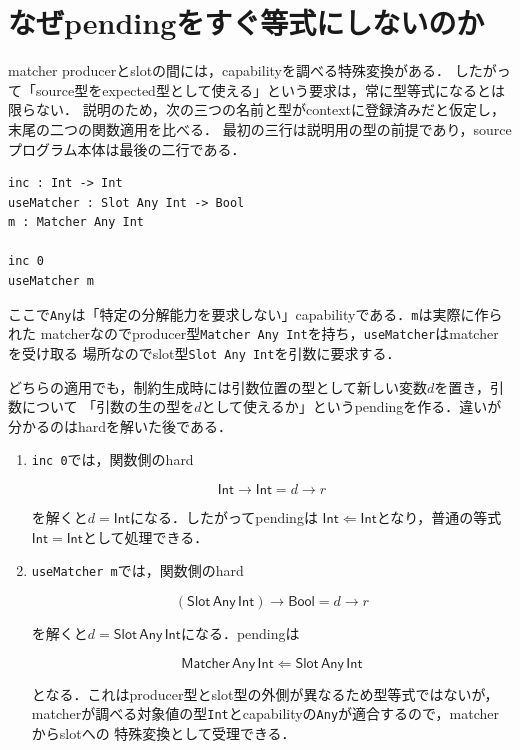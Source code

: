 \documentclass[11pt,a4paper,oneside]{ltjsbook}
\newcommand{\code}[1]{\texttt{#1}}
\newcommand{\checks}{\mathrel{\Leftarrow}}
\newcommand{\TyInt}{\mathsf{Int}}
\newcommand{\Matcher}{\mathsf{Matcher}}
\newcommand{\Slot}{\mathsf{Slot}}
\newcommand{\fn}{\mathbin{\to}}
\begin{document}
\section{なぜpendingをすぐ等式にしないのか}

matcher producerとslotの間には，capabilityを調べる特殊変換がある．
したがって「source型をexpected型として使える」という要求は，常に型等式になるとは限らない．
説明のため，次の三つの名前と型がcontextに登録済みだと仮定し，末尾の二つの関数適用を比べる．
最初の三行は説明用の型の前提であり，sourceプログラム本体は最後の二行である．

\begin{lstlisting}
inc : Int -> Int
useMatcher : Slot Any Int -> Bool
m : Matcher Any Int

inc 0
useMatcher m
\end{lstlisting}

ここで\code{Any}は「特定の分解能力を要求しない」capabilityである．\code{m}は実際に作られた
matcherなのでproducer型\code{Matcher Any Int}を持ち，\code{useMatcher}はmatcherを受け取る
場所なのでslot型\code{Slot Any Int}を引数に要求する．

どちらの適用でも，制約生成時には引数位置の型として新しい変数$d$を置き，引数について
「引数の生の型を$d$として使えるか」というpendingを作る．違いが分かるのはhardを解いた後である．

\begin{enumerate}[leftmargin=2em]
  \item \code{inc 0}では，関数側のhard

        \[
          \TyInt\fn\TyInt = d\fn r
        \]

        を解くと$d=\TyInt$になる．したがってpendingは
        $\TyInt\checks\TyInt$となり，普通の等式$\TyInt=\TyInt$として処理できる．
  \pagebreak[3]
  \item \code{useMatcher m}では，関数側のhard

        \[
          (\Slot\,\mathsf{Any}\,\TyInt)\fn\mathsf{Bool} = d\fn r
        \]

        を解くと$d=\Slot\,\mathsf{Any}\,\TyInt$になる．pendingは

        \[
          \Matcher\,\mathsf{Any}\,\TyInt
          \checks
          \Slot\,\mathsf{Any}\,\TyInt
        \]

        となる．これはproducer型とslot型の外側が異なるため型等式ではないが，
        matcherが調べる対象値の型\code{Int}とcapabilityの\code{Any}が適合するので，matcherからslotへの
        特殊変換として受理できる．
\end{enumerate}
\end{document}

